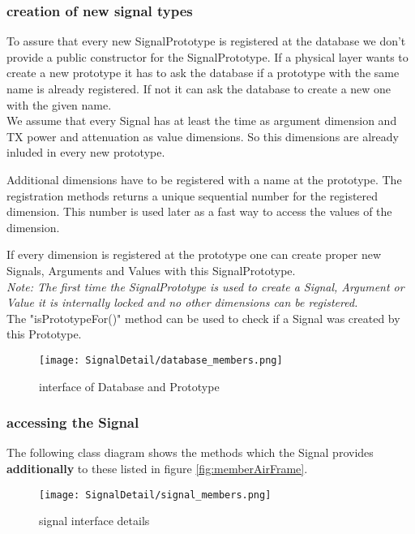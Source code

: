 \newpage
\subsubsection{creation of new signal types}

To assure that every new SignalPrototype is registered at the database we don't provide a public constructor for the SignalPrototype. If a physical layer wants to create a new prototype it has to ask the database if a prototype with the same name is already registered. If not it can ask the database to create a new one with the given name.\\

We assume that every Signal has at least the time as argument dimension and TX power and attenuation as value dimensions. So this dimensions are already inluded in every new prototype.

Additional dimensions have to be registered with a name at the prototype. The registration methods returns a unique sequential number for the registered dimension. This number is used later as a fast way to access the values of the dimension.

If every dimension is registered at the prototype one can create proper new Signals, Arguments and Values with this SignalPrototype.\\

\emph{Note: The first time the SignalPrototype is used to create a Signal, Argument or Value it is internally locked and no other dimensions can be registered.}\\

The "isPrototypeFor()" method can be used to check if a Signal was created by this Prototype.

\begin{figure}[H]
 \centering
 \texttt{[image: SignalDetail/database\_members.png]}
 \caption{interface of Database and Prototype}
 \label{fig: Database members}
\end{figure}
\newpage
\subsubsection{accessing the Signal}

The following class diagram shows the methods which the Signal provides \textbf{additionally} to these listed in figure \ref{fig:memberAirFrame}.

\begin{figure}[H]
 \centering
 \texttt{[image: SignalDetail/signal\_members.png]}
 \caption{signal interface details}
 \label{fig: detailed signal members}
\end{figure}

